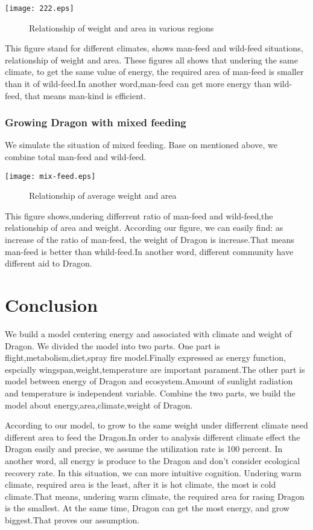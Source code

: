 \documentclass[12pt]{article}
\begin{document}
\centerline{\texttt{[image: 222.eps]}}
\begin{figure}[!htbp]
    \small
    \caption{Relationship of weight and area in various regions}\label{jj}
\end{figure}
This figure stand for different climates, shows man-feed and wild-feed situations, relationship of weight and area. These figures all shows that undering the same climate, to get the same value of energy, the required area of man-feed is smaller than it of wild-feed.In another word,man-feed can get more energy than wild-feed, that means man-kind is efficient.


\subsubsection{Growing Dragon with mixed feeding}%
We simulate the situation of mixed feeding. Base on mentioned above, we combine total man-feed and wild-feed.

\centerline{\texttt{[image: mix-feed.eps]}} %
\begin{figure}[!htbp]
    \small
    \caption{Relationship of average weight and area}\label{jj}
\end{figure}
This figure shows,undering differrent ratio of man-feed and wild-feed,the relationship of area and weight. According our figure, we can easily find: as increase of the ratio of man-feed, the weight of Dragon is increase.That means man-feed is better than whild-feed.In another word, different community have different aid to Dragon.

\section{Conclusion}
We build a model centering energy and associated with climate and weight of Dragon. We divided the model into two parts. One part is flight,metabolism,diet,spray fire model.Finally expressed as energy function, espcially wingspan,weight,temperature are important parament.The other part is model between energy of Dragon and ecosystem.Amount of sunlight radiation and temperature is independent variable. Combine the two parts, we build the model about energy,area,climate,weight of Dragon.

According to our model, to grow to the same weight under differrent climate need different area to feed the Dragon.In order to analysis different climate effect the Dragon easily and precise, we assume the utilization rate is 100 percent. In another word, all energy is produce to the Dragon and don't consider ecological recovery rate. In this situation, we can more intuitive cognition. Undering warm climate, required area is the least, after it is hot climate, the most is cold climate.That means, undering warm climate, the required area for rasing Dragon is the smallest. At the same time, Dragon can get the most energy, and grow biggest.That proves our assumption.
\end{document}
